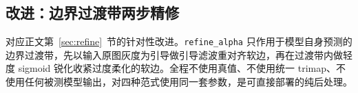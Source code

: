 \documentclass[supercite]{HustGraduPaper}
\begin{document}
\begin{appendices}
	\subsection{改进：边界过渡带两步精修}
	对应正文第~\ref{sec:refine}~节的针对性改进。\texttt{refine\_alpha} 只作用于模型自身预测的边界过渡带，先以输入原图灰度为引导做引导滤波重对齐软边，再在过渡带内做轻度 sigmoid 锐化收紧过度柔化的软边。全程不使用真值、不使用统一 trimap、不使用任何被测模型输出，对四种范式使用同一套参数，是可直接部署的纯后处理。
	
	\end{appendices}
\end{document}
